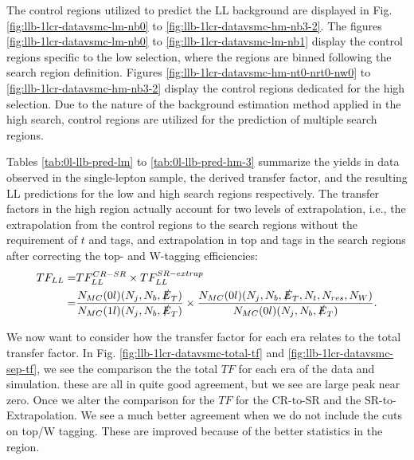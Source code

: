 The control regions utilized to predict the LL background are displayed in Fig. \ref{fig:llb-1lcr-datavsmc-lm-nb0} to \ref{fig:llb-1lcr-datavsmc-hm-nb3-2}. The figures \ref{fig:llb-1lcr-datavsmc-lm-nb0} to \ref{fig:llb-1lcr-datavsmc-lm-nb1} display the control regions specific to the low \dm{} selection, where the regions are binned following the search region definition. Figures \ref{fig:llb-1lcr-datavsmc-hm-nt0-nrt0-nw0} to \ref{fig:llb-1lcr-datavsmc-hm-nb3-2} display the control regions dedicated for the high \dm{} selection. Due to the nature of the background estimation method applied in the high \dm{} search, control regions are utilized for the prediction of multiple search regions. 

Tables \ref{tab:0l-llb-pred-lm} to \ref{tab:0l-llb-pred-hm-3} summarize the yields in data observed in the single-lepton sample, the derived transfer factor, and the resulting LL predictions for the low \dm{} and high \dm{} search regions respectively. The transfer factors in the high \dm{} region actually account for two levels of extrapolation, i.e., the extrapolation from the control regions to the search regions without the requirement of $t$ and \W{} tags, and extrapolation in top and \W{} tags in the search regions after correcting the top- and W-tagging efficiencies:
\begin{equation}\label{TFExtrapolation}
\begin{split}
TF_{LL}=& TF_{LL}^{CR-SR}\times TF_{LL}^{SR-extrap} \\
=& \frac{N_{MC}(0l)(N_{j},N_{b},\slashed{E}_{T})}{N_{MC}(1l)(N_{j},N_{b},\slashed{E}_{T})}\times\frac{N_{MC}(0l)(N_{j},N_{b},\slashed{E}_{T},N_{t},N_{res},N_{W})}{N_{MC}(0l)(N_{j},N_{b},\slashed{E}_{T})}.
\end{split}
\end{equation}

We now want to consider how the transfer factor for each era relates to the total transfer factor. In Fig. \ref{fig:llb-1lcr-datavsmc-total-tf} and \ref{fig:llb-1lcr-datavsmc-sep-tf}, we see the comparison the the total $TF$ for each era of the data and simulation. these are all in quite good agreement, but we see are large peak near zero. Once we alter the comparison for the $TF$ for the CR-to-SR and the SR-to-Extrapolation. We see a much better agreement when we do not include the cuts on top/W tagging. These are improved because of the better statistics in the region. 






